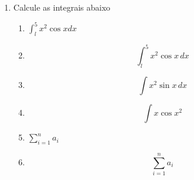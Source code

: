 \documentclass[a4paper, 12pt]{article}
\newcommand{\integral}{\displaystyle\int}
\begin{document}
\begin{enumerate}
        \item Calcule as integrais abaixo
        \begin{enumerate}
            \item $\int_l^5 x^2\cos x dx$
            \item $$\int_l^5 x^2\cos x \, dx$$
            \item $$\displaystyle\int x^2 \sin x \, dx$$
            \item $$\integral x \cos x^2$$
            \item $\sum_{i=1}^n a_i$
            \item $$\sum_{i=1}^n a_i$$
        \end{enumerate}
    \end{enumerate}
\end{document}
